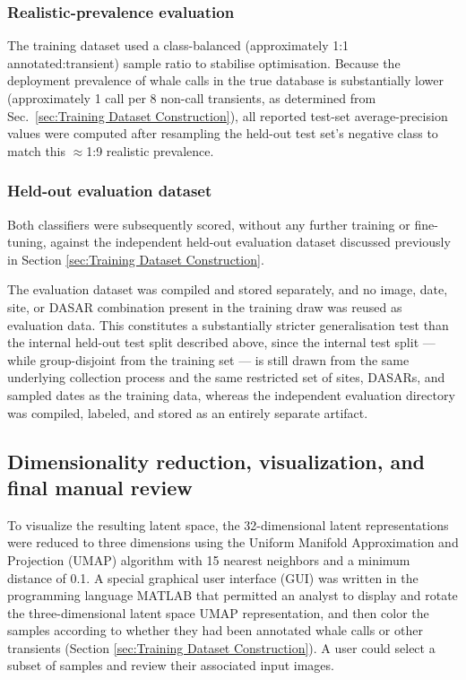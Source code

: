\documentclass[preprint,NumberedRefs]{JASAnew}
\begin{document}
\subsubsection{Realistic-prevalence evaluation}
The training dataset used a class-balanced (approximately 1:1 annotated:transient) sample ratio
to stabilise optimisation. Because the deployment prevalence of whale calls in the true database is
substantially lower (approximately 1 call per 8 non-call transients, as
determined from Sec.~\ref{sec:Training Dataset Construction}), all reported test-set
average-precision values were computed after resampling the held-out test
set's negative class to match this $\approx$1:9 realistic prevalence.

\subsubsection{Held-out evaluation dataset}
Both classifiers were subsequently scored, without any further training or
fine-tuning, against the independent held-out evaluation dataset discussed previously in Section \ref{sec:Training Dataset Construction}.


The evaluation dataset was compiled and
stored separately, and no image, date, site, or DASAR combination present
in the training draw was reused as evaluation data. This constitutes a
substantially stricter generalisation test than the internal held-out test
split described above, since the internal test split — while
group-disjoint from the training set — is still drawn from the same
underlying collection process and the same restricted set of sites,
DASARs, and sampled dates as the training data, whereas the independent
evaluation directory was compiled, labeled, and stored as an entirely
separate artifact.


\subsection{Dimensionality reduction, visualization, and final manual review}
\label{sec:DatasetEditing}
To visualize the resulting latent space, the 32-dimensional latent representations were reduced to three dimensions using the Uniform Manifold Approximation and Projection (UMAP) algorithm \cite{mcinnes2018umap} with 15 nearest neighbors and a minimum distance of 0.1.  A special graphical user interface (GUI) was written in the programming language MATLAB that permitted an analyst to display and rotate the three-dimensional latent space UMAP representation, and then color the samples according to whether they had been annotated whale calls or other transients (Section \ref{sec:Training Dataset Construction}).  A user could select a subset of samples and review their associated input images.  
\end{document}
